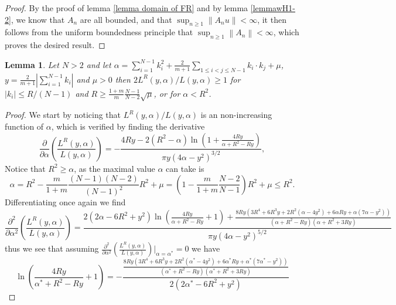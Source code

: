 \documentclass[a4paper,11pt]{article}
\newcommand{\norm}[1]{\left\lVert #1 \right\rVert}
\newcommand{\abs}[1]{\left\lvert #1 \right\rvert}
\newtheorem{lemma}{Lemma}
\numberwithin{equation}{section}
\begin{document}
	\begin{proof}
		By the proof of lemma \ref{lemma domain of FR} and by lemma \ref{lemmawH1-2}, we know that $ A_n $ are all bounded, and that $ \sup_{n\geq 1}\norm{A_nu}<\infty $, it then follows from the uniform boundedness principle that $ \sup_{n\geq1}\norm{A_n}<\infty $, which proves the desired result.	\end{proof}
	\begin{lemma}
		Let $ N>2 $ and let $ \alpha=\sum_{i=1}^{N-1}k_i^2+\frac{2}{m+1}\sum_{1\leq i<j\leq N-1}k_i\cdot k_j+\mu $, $ y=\frac{2}{m+1}\abs{\sum_{i=1}^{N-1}k_i} $ and $ \mu>0 $ then $ 2L^R(y,\alpha)/L(y,\alpha)\geq1 $ for $ \abs{k_i}\leq R/(N-1) $ and $ R\geq\frac{1+m}{m}\frac{N-1}{N-2}\sqrt{\mu} $, or for $ \alpha<R^2 $.
	\end{lemma}
	\begin{proof}
		We start by noticing that $ L^R(y,\alpha)/L(y,\alpha) $ is an non-increasing function of $ \alpha $, which is verified by finding the derivative\begin{equation}
		\frac{\partial}{\partial \alpha}\left(\frac{L^R(y,\alpha)}{L(y,\alpha)}\right)=-\frac{4 R y-2 \left(R^2-\alpha \right) \ln \left(1+\frac{4 R y}{\alpha +R^2-R y}\right)}{\pi  y \left(4 \alpha -y^2\right)^{3/2}},
		\end{equation}
		Notice that $ R^2\geq\alpha $, as the maximal value $ \alpha $ can take is \begin{equation}
		\alpha=R^2-\frac{m}{1+m}\frac{(N-1)(N-2)}{(N-1)^2}R^2+\mu=\left(1-\frac{m}{1+m}\frac{N-2}{N-1}\right)R^2+\mu\leq R^2.
		\end{equation}
		Differentiating once again we find \begin{equation}
		\frac{\partial^2}{\partial \alpha^2}\left(\frac{L^R(y,\alpha)}{L(y,\alpha)}\right)=\frac{2 \left(2 \alpha -6 R^2+y^2\right) \ln \left(\frac{4 R y}{\alpha +R^2-R y}+1\right)+\frac{8 R y \left(3 R^4+6 R^3 y+2 R^2 \left(\alpha -4 y^2\right)+6 \alpha  R y+\alpha  \left(7 \alpha
				-y^2\right)\right)}{\left(\alpha +R^2-R y\right) \left(\alpha +R^2+3 R y\right)}}{\pi  y \left(4 \alpha -y^2\right)^{5/2}}
		\end{equation}
		thus we see that assuming $ \frac{\partial^2}{\partial \alpha^2}\left(\frac{L^R(y,\alpha)}{L(y,\alpha)}\right)\rvert_{\alpha=\alpha^*}=0 $ we have \begin{equation}
		\ln \left(\frac{4 R y}{\alpha^* +R^2-R y}+1\right)=-\frac{\frac{8 R y \left(3 R^4+6 R^3 y+2 R^2 \left(\alpha^* -4 y^2\right)+6 \alpha^*  R y+\alpha^*  \left(7 \alpha^*
				-y^2\right)\right)}{\left(\alpha^* +R^2-R y\right) \left(\alpha^* +R^2+3 R y\right)}}{2 \left(2 \alpha^* -6 R^2+y^2\right) }

\end{equation}
\end{proof}
\end{document}
